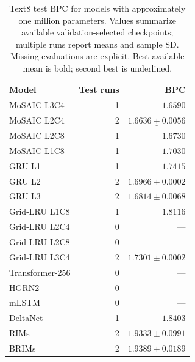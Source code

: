 \begin{table}[H]
\centering
\caption{Text8 test BPC for models with approximately one million parameters. Values summarize available validation-selected checkpoints; multiple runs report means and sample SD. Missing evaluations are explicit. Best available mean is bold; second best is underlined.}
\label{tab:midtest}
\begin{tabular}{lrr}
\toprule
Model & Test runs & BPC \\
\midrule
MoSAIC L3C4 & 1 & $\mathbf{1.6590}$ \\
MoSAIC L2C4 & 2 & $\underline{1.6636\pm0.0056}$ \\
MoSAIC L2C8 & 1 & $1.6730$ \\
MoSAIC L1C8 & 1 & $1.7030$ \\
GRU L1 & 1 & $1.7415$ \\
GRU L2 & 2 & $1.6966\pm0.0002$ \\
GRU L3 & 2 & $1.6814\pm0.0068$ \\
Grid-LRU L1C8 & 1 & $1.8116$ \\
Grid-LRU L2C4 & 0 & --- \\
Grid-LRU L2C8 & 0 & --- \\
Grid-LRU L3C4 & 2 & $1.7301\pm0.0002$ \\
Transformer-256 & 0 & --- \\
HGRN2 & 0 & --- \\
mLSTM & 0 & --- \\
DeltaNet & 1 & $1.8403$ \\
RIMs & 2 & $1.9333\pm0.0991$ \\
BRIMs & 2 & $1.9389\pm0.0189$ \\
\bottomrule
\end{tabular}
\end{table}
